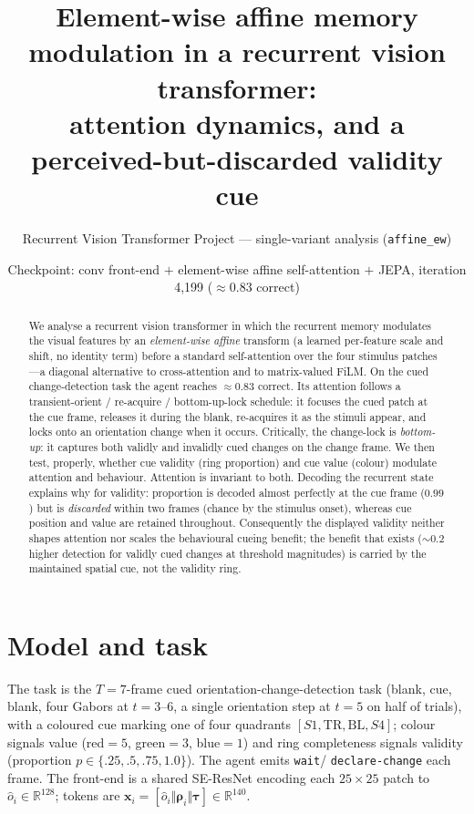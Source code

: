 \documentclass[11pt]{article}
\title{\textbf{Element-wise affine memory modulation in a recurrent vision transformer:\\
attention dynamics, and a perceived-but-discarded validity cue}}
\author{Recurrent Vision Transformer Project --- single-variant analysis (\texttt{affine\_ew})}
\date{Checkpoint: conv front-end $+$ element-wise affine self-attention $+$ JEPA, iteration 4{,}199 ($\approx0.83$ correct)}
\newcommand{\Rd}{\mathbb{R}}
\begin{document}
\maketitle
\begin{abstract}\noindent
We analyse a recurrent vision transformer in which the recurrent memory modulates the visual features by
an \emph{element-wise affine} transform (a learned per-feature scale and shift, no identity term) before a
standard self-attention over the four stimulus patches---a diagonal alternative to cross-attention and to
matrix-valued FiLM. On the cued change-detection task the agent reaches $\approx0.83$ correct. Its
attention follows a transient-orient / re-acquire / bottom-up-lock schedule: it focuses the cued patch at
the cue frame, releases it during the blank, re-acquires it as the stimuli appear, and locks onto an
orientation change when it occurs. Critically, the change-lock is \emph{bottom-up}: it captures both
validly and invalidly cued changes on the change frame. We then test, properly, whether cue validity
(ring proportion) and cue value (colour) modulate attention and behaviour. Attention is invariant to both.
Decoding the recurrent state explains why for validity: proportion is decoded almost perfectly at the cue
frame ($0.99$) but is \emph{discarded} within two frames (chance by the stimulus onset), whereas cue
position and value are retained throughout. Consequently the displayed validity neither shapes attention
nor scales the behavioural cueing benefit; the benefit that exists ($\sim0.2$ higher detection for validly
cued changes at threshold magnitudes) is carried by the maintained spatial cue, not the validity ring.
\end{abstract}

\section{Model and task}
The task is the $T{=}7$-frame cued orientation-change-detection task (blank, cue, blank, four Gabors at
$t{=}3$--$6$, a single orientation step at $t{=}5$ on half of trials), with a coloured cue marking one of
four quadrants $[S1,\text{TR},\text{BL},S4]$; colour signals value (red$=5$, green$=3$, blue$=1$) and ring
completeness signals validity (proportion $p\in\{.25,.5,.75,1.0\}$). The agent emits \texttt{wait}/
\texttt{declare-change} each frame. The front-end is a shared SE-ResNet encoding each $25\times25$ patch to
$\hat o_i\in\Rd^{128}$; tokens are $\bm x_i=[\hat o_i\Vert\bm\rho_i\Vert\bm\tau]\in\Rd^{140}$.
\end{document}
